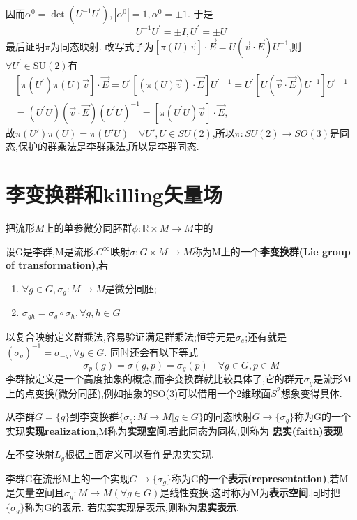 \documentclass[../main.tex]{subfiles}
\begin{document}
	因而$  \alpha^{0}=\operatorname{det}\left(U^{-1} U^{\prime}\right),\left|\alpha^{0}\right|=1, \alpha^{0}= \pm 1 $. 于是$$  U^{-1} U^{\prime}= \pm I, U^{\prime}= \pm U $$
最后证明$  \pi  $为同态映射.
改写式子为$[\pi(U) \vec{v}] \cdot \vec{E}=U(\vec{v} \cdot \vec{E}) U^{-1}$,则$  \forall U^{\prime} \in \mathrm{SU}(2)  $有
$$\begin{array}{c}{\left[\pi\left(U^{\prime}\right) \pi(U) \vec{v}\right] \cdot \vec{E}=U^{\prime}[(\pi(U) \vec{v}) \cdot \vec{E}] U^{\prime-1}=U^{\prime}\left[U(\vec{v} \cdot \vec{E}) U^{-1}\right] U^{\prime-1}} \\=\left(U^{\prime} U\right)(\vec{v} \cdot \vec{E})\left(U^{\prime} U\right)^{-1}=\left[\pi\left(U^{\prime} U\right) \vec{v}\right] \cdot \vec{E},\end{array}$$
故$\pi(U')\pi(U) = \pi (U'U)\quad \forall U',U \in SU(2)$,所以$\pi : SU(2)\rightarrow SO(3)$是同态,保护的群乘法是李群乘法,所以是李群同态.
\chapter{李变换群和killing矢量场}
把流形$M$上的单参微分同胚群$\phi :\mathbb{R}\times M \rightarrow M$中的
\begin{definition}
	设G是李群,M是流形.$C^\infty$映射$\sigma:G\times M \rightarrow M$称为M上的一个\textbf{李变换群(Lie group of transformation)},若
	\begin{enumerate}
		\item $\forall g \in G, \sigma_g:M\rightarrow M $是微分同胚;
		\item $\sigma_{gh} = \sigma_g \circ \sigma_h, \forall g,h \in G$
	\end{enumerate}
\end{definition}
以复合映射定义群乘法,容易验证满足群乘法;恒等元是$\sigma_e$;还有就是$(\sigma_g)^{-1} = \sigma_{-g},\forall g \in G$.
同时还会有以下等式$$\sigma_p(g) = \sigma(g,p) = \sigma_g(p)\quad \forall g\in G, p \in M$$
李群按定义是一个高度抽象的概念,而李变换群就比较具体了,它的群元$\sigma_g$是流形M上的点变换(微分同胚),例如抽象的SO(3)可以借用一个2维球面$S^2$想象变得具体.
\begin{definition}
	从李群$G =\{g\}$到李变换群$\{\sigma_g: M\rightarrow M|g\in G\}$的同态映射$G \rightarrow \{\sigma_g\} $称为G的一个实现\textbf{实现{realization}},M称为\textbf{实现空间}.若此同态为同构,则称为
	\textbf{忠实(faith)表现}
\end{definition}
\begin{note}
	左不变映射$L_g$根据上面定义可以看作是忠实实现.
\end{note}
\begin{definition}
	李群G在流形M上的一个实现$G \rightarrow \{\sigma_g\}$称为G的一个\textbf{表示(representation)},若M是矢量空间且$\sigma_g : M\rightarrow M(\forall g \in G)$是线性变换.这时称为M为\textbf{表示空间}.同时把$\{\sigma_g\}$称为G的表示.
	若忠实实现是表示,则称为\textbf{忠实表示}.
\end{definition}
\end{document}
